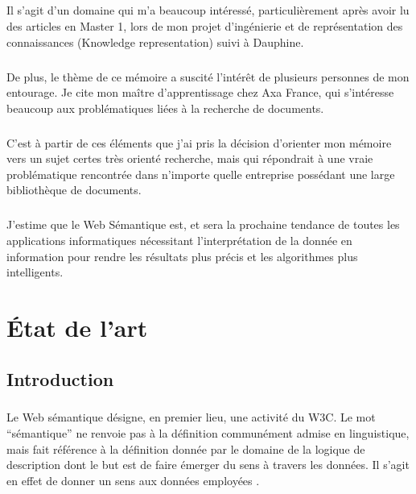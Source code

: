 \documentclass[12pt, a4paper, oneside]{book}
\begin{document}
\paragraph{}
Il s'agit d'un domaine qui m'a beaucoup intéressé, particulièrement après avoir lu des articles en Master 1, lors de mon projet d'ingénierie et de représentation des connaissances (Knowledge representation) suivi à Dauphine.
\paragraph{}
De plus, le thème de ce mémoire a suscité l'intérêt de plusieurs personnes de mon entourage. Je cite mon maître d'apprentissage chez Axa France, qui s'intéresse beaucoup aux problématiques liées à la recherche de documents.
\paragraph{}
C'est à partir de ces éléments que j'ai pris la décision d'orienter mon mémoire vers un sujet certes très orienté recherche, mais qui répondrait à une vraie problématique rencontrée dans n'importe quelle entreprise possédant une large bibliothèque de documents.
\paragraph{}
J'estime que le Web Sémantique est, et sera la prochaine tendance de toutes les applications informatiques nécessitant l'interprétation de la donnée en information pour rendre les résultats plus précis et les algorithmes plus intelligents.


\chapter{État de l'art}
\section{Introduction}

\paragraph{}
Le Web sémantique désigne, en premier lieu, une activité du W3C.
Le mot “sémantique” ne renvoie pas à la définition communément admise en linguistique, mais fait référence à la définition donnée par le domaine de la logique de description dont le but est de faire émerger du sens à travers les données. Il s'agit en effet de donner un sens aux données employées \citep{w3c}.
\end{document}
